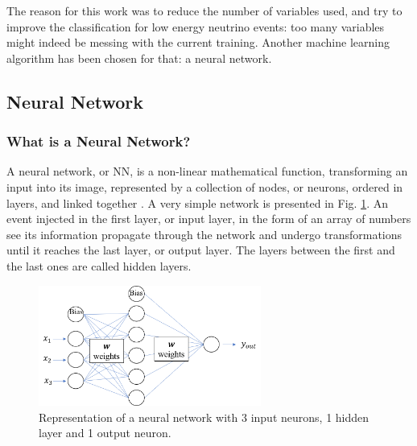 The reason for this work was to reduce the number of variables used, and try to improve the classification for low energy neutrino events: too many variables might indeed be messing with the current training. Another machine learning algorithm has been chosen for that: a neural network.
    
\subsection{Neural Network}

\subsubsection{What is a Neural Network?}

\qquad A neural network, or NN, is a non-linear mathematical function, transforming an input into its image, represented by a collection of nodes, or neurons, ordered in layers, and linked together \citep{MacKay2003}. A very simple network is presented in Fig. \ref{fig:XXX}. An event injected in the first layer, or input layer, in the form of an array of numbers see its information propagate through the network and undergo transformations until it reaches the last layer, or output layer. The layers between the first and the last ones are called hidden layers.

\begin{figure}[h!]
    \centering
    \includegraphics[width=0.65\textwidth]{fig/NN_shape_et_layout.png}
    \caption{Representation of a neural network with 3 input neurons, 1 hidden layer and 1 output neuron.}
    \label{fig:XXX}
\end{figure}

